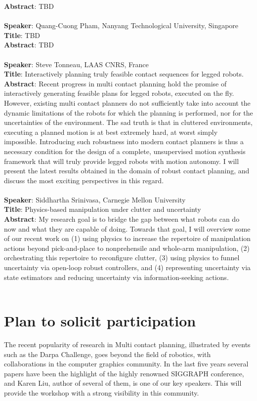 \documentclass[conference]{IEEEtran}
\begin{document}
\textbf{Abstract}: TBD \\ \\
\textbf{Speaker}: Quang-Cuong Pham, Nanyang Technological University, Singapore \\
\textbf{Title}:  TBD \\
\textbf{Abstract}: TBD \\ \\
\textbf{Speaker}: Steve Tonneau, LAAS CNRS, France \\
\textbf{Title}: Interactively planning truly feasible contact sequences for legged robots.\\
\textbf{Abstract}: Recent progress in multi contact planning hold the promise of interactively generating feasible plans for legged robots, executed on the fly.
However, existing multi contact planners do not sufficiently take into account the dynamic limitations of the robots for which the planning is performed, nor for the uncertainties of the environment. The sad truth is that in cluttered environments, executing a planned motion is at best extremely hard, at worst simply impossible. Introducing such
robustness into modern contact planners is thus a necessary condition for the design of a complete, unsupervised
motion synthesis framework that will truly provide legged robots with motion autonomy. I will
present the latest results obtained in the domain of robust contact planning, and discuss the most exciting perspectives
in this regard.\\ \\
\textbf{Speaker}: Siddhartha Srinivasa, Carnegie Mellon University \\ 
\textbf{Title}: Physics-based manipulation under clutter and uncertainty \\
\textbf{Abstract}: My research goal is to bridge the gap between what robots can do now and what they are capable of doing. Towards that goal, I will overview some of our recent work on (1) using physics to increase the repertoire of manipulation actions beyond pick-and-place to nonprehensile and whole-arm manipulation, (2) orchestrating this repertoire to reconfigure clutter, (3) using physics to funnel uncertainty via open-loop robust controllers, and (4) representing uncertainty via state estimators and reducing uncertainty via information-seeking actions. \\ \\

\section{Plan to solicit participation}
The recent popularity of research in Multi contact planning, illustrated by events such as the Darpa Challenge, goes beyond the field of robotics, with collaborations in the computer graphics community. In the last five years several papers have been the highlight of the highly renowned SIGGRAPH conference, and Karen Liu, author of several of them, is one of our key speakers. This will provide the workshop with a strong visibility in this community.
\end{document}
